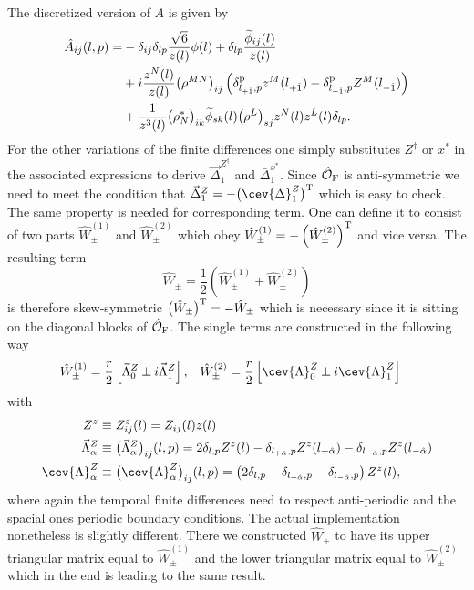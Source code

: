 %
%
The discretized version of $A$ is given by
%
%
\begin{align}
\hat{A}_{ij}(l,p) = &-\delta_{ij}\delta_{lp}\frac{\sqrt{6}}{z(l)}\phi(l) + \delta_{lp}\frac{\widetilde{\phi}_{ij}(l)}{z(l)} \notag \\
%
&+i \frac{z^{N}(l)}{z(l)} \big(\rho^{MN}\big)_{ij} \left( \delta^{\rm p}_{l_{+\hat{1}},p} z^{M}(l_{+\hat{1}}) - \delta^{\rm p}_{l_{-\hat{1}},p} Z^{M}(l_{-\hat{1}})\right) \\
%
&+ \frac{1}{z^{3}(l)} \big(\rho^{*}_{N}\big)_{ik} \widetilde{\phi}_{sk}(l) \big(\rho^{L}\big)_{sj} z^{N}(l)z^{L}(l) \delta_{lp}. \notag
\end{align}
%
%
For the other variations of the finite differences one simply substitutes $Z^{\dagger}$ or $x^{*}$ in the associated expressions to derive $\vec{\Delta}^{Z^{\dagger}}_{1}$ and $\bar{\Delta}^{x^{*}}_{1}$. Since $\hat{\mathcal{O}}_{\rm F}$ is anti-symmetric we need to meet the condition that $\vec{\Delta}^{Z}_{1}=-\big( \cev{\Delta}^{Z}_{1} \big)^{\rm T}$ which is easy to check. The same property is needed for corresponding  term. One can define it to consist of two parts $\hat{W}^{(1)}_{\pm}$ and $\hat{W}^{(2)}_{\pm}$ which obey $\hat{W}^{(1)}_{\pm} = -\left( \hat{W}^{(2)}_{\pm} \right)^{\rm T}$ and vice versa. The resulting  term
%
%
\begin{equation}
\hat{W}_{\pm} = \frac{1}{2}\left( \hat{W}^{(1)}_{\pm} + \hat{W}^{(2)}_{\pm} \right)
\end{equation}
%
%
is therefore skew-symmetric $\big(\hat{W}_{\pm}\big)^{\rm T} = -\hat{W}_{\pm}$ which is necessary since it is sitting on the diagonal blocks of $\hat{\mathcal{O}}_{\rm F}$. The single terms are constructed in the following way
%
%
\begin{align}
\hat{W}^{(1)}_{\pm} &= \frac{r}{2} \left[ \vec{\Lambda}^{Z}_{0} \pm i \vec{\Lambda}^{Z}_{1}\right] , &
\hat{W}^{(2)}_{\pm} &= \frac{r}{2} \left[ \cev{\Lambda}^{Z}_{0} \pm i \cev{\Lambda}^{Z}_{1}\right]
\end{align}
%
%
with 
%
%
\begin{align}
Z^{z} &\equiv Z^{z}_{ij}(l) = Z_{ij}(l)z(l) \notag \\
\vec{\Lambda}^{Z}_{\alpha} &\equiv \big(\vec{\Lambda}^{Z}_{\alpha}\big)_{ij}(l,p) = 2\delta_{l,p}Z^{z}(l) - \delta_{l_{+\hat{\alpha}},p}Z^{z}(l_{+\hat{\alpha}}) - \delta_{l_{-\hat{\alpha}},p}Z^{z}(l_{-\hat{\alpha}}) \\
%
%
\cev{\Lambda}^{Z}_{\alpha} &\equiv \big(\cev{\Lambda}^{Z}_{\alpha}\big)_{ij}(l,p) = \left( 2 \delta_{l,p} -\delta_{l_{+\hat{\alpha}},p} - \delta_{l_{-\hat{\alpha}},p} \right) Z^{z}(l), \notag
\end{align}
%
%
where again the temporal finite differences need to respect anti-periodic and the spacial ones periodic boundary conditions. The actual implementation nonetheless is slightly different. There we constructed $\hat{W}_{\pm}$ to have its upper triangular matrix equal to $\hat{W}_{\pm}^{(1)}$ and the lower triangular matrix equal to $\hat{W}_{\pm}^{(2)}$ which in the end is leading to the same result.